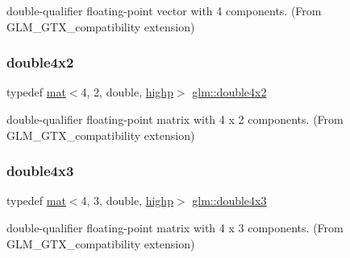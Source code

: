 double-\/qualifier floating-\/point vector with 4 components. (From G\+L\+M\+\_\+\+G\+T\+X\+\_\+compatibility extension) 

\mbox{\label{group__gtx__compatibility_ga5ca0eb6627cf8829e3cab6694d1a6452}} 
\subsubsection{\texorpdfstring{double4x2}{double4x2}}
{\footnotesize\ttfamily typedef \mbox{\hyperlink{structglm_1_1mat}{mat}}$<$4, 2, double, \mbox{\hyperlink{namespaceglm_a36ed105b07c7746804d7fdc7cc90ff25ac6f7eab42eacbb10d59a58e95e362074}{highp}}$>$ \mbox{\hyperlink{group__gtx__compatibility_ga5ca0eb6627cf8829e3cab6694d1a6452}{glm\+::double4x2}}}



double-\/qualifier floating-\/point matrix with 4 x 2 components. (From G\+L\+M\+\_\+\+G\+T\+X\+\_\+compatibility extension) 

\mbox{\label{group__gtx__compatibility_ga2f73c8a3c9cd5198695163229f0ce754}} 
\subsubsection{\texorpdfstring{double4x3}{double4x3}}
{\footnotesize\ttfamily typedef \mbox{\hyperlink{structglm_1_1mat}{mat}}$<$4, 3, double, \mbox{\hyperlink{namespaceglm_a36ed105b07c7746804d7fdc7cc90ff25ac6f7eab42eacbb10d59a58e95e362074}{highp}}$>$ \mbox{\hyperlink{group__gtx__compatibility_ga2f73c8a3c9cd5198695163229f0ce754}{glm\+::double4x3}}}



double-\/qualifier floating-\/point matrix with 4 x 3 components. (From G\+L\+M\+\_\+\+G\+T\+X\+\_\+compatibility extension) 

\mbox{\label{group__gtx__compatibility_gaa0d75f4adb5cb1af3b1ba09720954306}} 
